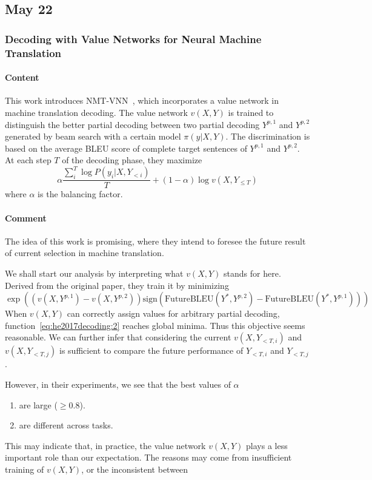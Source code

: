\subsection*{May 22}
\subsubsection*{Decoding with Value Networks for Neural Machine Translation}\label{paper:he2017decoding}

\paragraph{Content}
This work introduces \textsc{NMT-VNN}~\cite{he2017decoding}, which incorporates a value network in machine translation decoding. The value network $v(X, Y)$ is trained to distinguish the better partial decoding  between two partial decoding $Y^{p,1}$ and $Y^{p,2}$ generated by beam search with a certain model $\pi(y|X, Y)$. The discrimination is based on the average BLEU score of complete target sentences of $Y^{p,1}$ and $Y^{p,2}$. At each step $T$ of the decoding phase, they maximize
\begin{equation}\label{eq:he2017decoding:1}
    \alpha\frac{\sum_i^T \log P(y_i|X, Y_{< i})}{T} + (1-\alpha) \log v(X, Y_{\le T})
\end{equation}
where $\alpha$ is the balancing factor.


\paragraph{Comment}
The idea of this work is promising, where they intend to foresee the future result of current selection in machine translation.

We shall start our analysis by interpreting what $v(X,Y)$ stands for here. Derived from the original paper, they train it by minimizing
\begin{equation}\label{eq:he2017decoding:2}
    \exp \left( \left(v(X, Y^{p,1}) - v(X, Y^{p,2})\right) \mathrm{sign}\left(\mathrm{FutureBLEU}(Y^*, Y^{p,2}) - \mathrm{FutureBLEU}(Y^*, Y^{p,1})\right) \right)
\end{equation}
When $v(X, Y)$ can correctly assign values for arbitrary partial decoding, function~\ref{eq:he2017decoding:2} reaches global minima. Thus this objective seems reasonable. We can further infer that considering the current $v(X, Y_{< T, i})$ and $v(X, Y_{< T, j})$ is sufficient to compare the future performance of $Y_{< T, i}$ and $Y_{< T, j}$.

However, in their experiments, we see that the best values of $\alpha$ \begin{enumerate}
    \item are large ($\ge 0.8$).
    \item are different across tasks.
\end{enumerate}
This may indicate that, in practice, the value network $v(X, Y)$ plays a less important role than our expectation. The reasons may come from insufficient training of $v(X,Y)$, or the inconsistent between 
